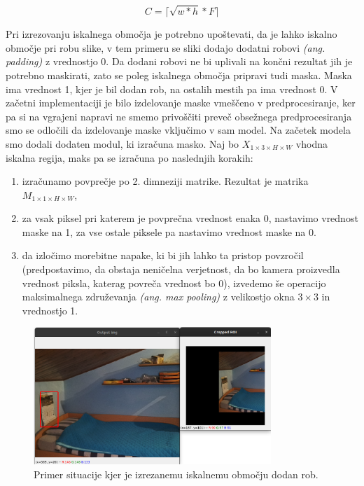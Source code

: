 \documentclass[a4paper,12pt,openright]{book}
\begin{document}
\begin{equation}
    C = \lceil{\sqrt{w * h} * F} \rceil
    \label{eq:bbox}
\end{equation}


Pri izrezovanju iskalnega območja je potrebno upoštevati, da je lahko iskalno območje pri robu slike, v tem primeru se sliki dodajo dodatni robovi \emph{(ang. padding)} z vrednostjo 0. Da dodani robovi ne bi uplivali na končni rezultat jih je potrebno maskirati, zato se poleg iskalnega območja pripravi tudi maska. Maska ima vrednost 1, kjer je bil dodan rob, na ostalih mestih pa ima vrednost 0. V začetni implementaciji je bilo izdelovanje maske vmeščeno v predprocesiranje, ker pa si na vgrajeni napravi ne smemo privoščiti preveč obsežnega predprocesiranja smo se odločili da izdelovanje maske vključimo v sam model. Na začetek modela smo dodali dodaten modul, ki izračuna masko. Naj bo $ X_{1 \times 3 \times H \times W} $ vhodna iskalna regija, maks pa se izračuna po naslednjih korakih:

\begin{enumerate}
    \item izračunamo povprečje po 2. dimneziji matrike. Rezultat je matrika $ M_{1 \times 1 \times H \times W} $,
    \item za vsak piksel pri katerem je povprečna vrednost enaka 0, nastavimo vrednost maske na 1, za vse ostale piksele pa nastavimo vrednost maske na 0.
    \item da izločimo morebitne napake, ki bi jih lahko ta pristop povzročil (predpostavimo, da obstaja neničelna verjetnost, da bo kamera proizvedla vrednost piksla, katerag povreča vrednost bo 0), izvedemo še operacijo maksimalnega združevanja \emph{(ang. max pooling)} z velikostjo okna $ 3 \times 3 $ in vrednostjo 1.
\end{enumerate}

\begin{figure}[htb]
    \begin{center}
        \includegraphics[width=0.8\textwidth]{img/example_mask.png}
    \end{center}
    \caption{Primer situacije kjer je izrezanemu iskalnemu območju dodan rob.}
    \label{img:mask}
\end{figure}
\end{document}
